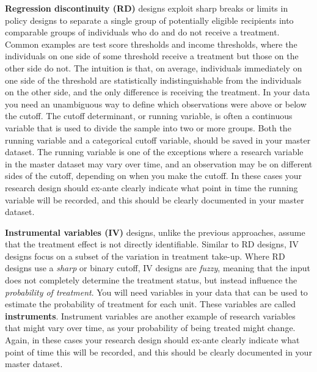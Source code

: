 \textbf{Regression discontinuity (RD)}
designs exploit sharp breaks or limits
in policy designs to separate a single group of potentially eligible recipients
into comparable groups of individuals who do and do not receive a treatment.
Common examples are test score thresholds and income thresholds,
where the individuals on one side of some threshold receive
a treatment but those on the other side do not.
The intuition is that, on average,
individuals immediately on one side of the threshold
are statistically indistinguishable from the individuals on the other side,
and the only difference is receiving the treatment.
In your data you need an unambiguous way
to define which observations were above or below the cutoff.
The cutoff determinant, or running variable,
is often a continuous variable 
that is used to divide the sample into two or more groups. 
Both the running variable and a categorical cutoff variable,
should be saved in your master dataset.
The running variable is one of the exceptions where
a research variable in the master dataset
may vary over time,
and an observation may be on different sides of the cutoff, 
depending on when you make the cutoff.
In these cases your research design should 
ex-ante clearly indicate what point in time 
the running variable will be recorded, 
and this should be clearly documented in your master dataset.



\textbf{Instrumental variables (IV)}
designs, unlike the previous approaches,
assume that the treatment effect is not directly identifiable.
Similar to RD designs,
IV designs focus on a subset of the variation in treatment take-up.
Where RD designs use a \textit{sharp} or binary cutoff,
IV designs are \textit{fuzzy}, meaning that the input does not completely determine
the treatment status, but instead influence the \textit{probability of treatment}.
You will need variables in your data
that can be used to estimate the probability of treatment for each unit.
These variables are called \textbf{instruments}.
Instrument variables are another example of research variables 
that might vary over time,
as your probability of being treated might change. 
Again, in these cases your research design should 
ex-ante clearly indicate what point of time this will be recorded, 
and this should be clearly documented in your master dataset.

